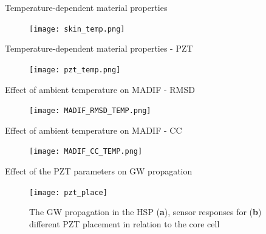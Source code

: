 \documentclass[10pt,aspectratio=169]{beamer} %
\begin{document}
\begin{frame}[label=frame24]{Temperature-dependent material properties}
	\begin{figure}
		\texttt{[image: skin\_temp.png]}
		\label{fig:SKIN_TEMP}
	\end{figure}
\end{frame}

\begin{frame}[label=frame24]{Temperature-dependent material properties - PZT}
	\begin{figure}
		\texttt{[image: pzt\_temp.png]}
		\label{fig:PZT_TEMP}
	\end{figure}
\end{frame}

\begin{frame}[label=frame24]{Effect of ambient temperature on MADIF - RMSD}
	\begin{figure}
		\texttt{[image: MADIF\_RMSD\_TEMP.png]}
		\label{fig:MADIF_RMSD_TEMP}
	\end{figure}
\end{frame}
\begin{frame}[label=frame24]{Effect of ambient temperature on MADIF - CC}
	\begin{figure}
		\texttt{[image: MADIF\_CC\_TEMP.png]}
		\label{fig:MADIF_CC_TEMP}
	\end{figure}
\end{frame}
\begin{frame}[label=frame25]{Effect of the PZT parameters on GW propagation}
	\begin{figure}
		\begin{center}
			\texttt{[image: pzt\_place]}
		\end{center}
		\caption{The GW propagation in the HSP (\textbf{a}), sensor responses for (\textbf{b}) different PZT placement in relation to the core cell}
		\label{fig:pzt_place}
	\end{figure}
\end{frame}
\end{document}
